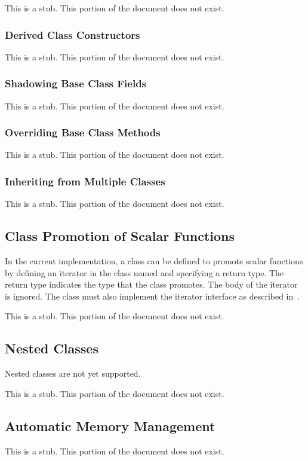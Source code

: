 This is a stub.  This portion of the document does not exist.

\subsubsection{Derived Class Constructors}
\label{Derived_Class_Constructors}

This is a stub.  This portion of the document does not exist.

\subsubsection{Shadowing Base Class Fields}
\label{Shadowing_Base_Class_Fields}

This is a stub.  This portion of the document does not exist.

\subsubsection{Overriding Base Class Methods}
\label{Overriding_Base_Class_Methods}

This is a stub.  This portion of the document does not exist.

\subsubsection{Inheriting from Multiple Classes}
\label{Inheriting_from_Multiple_Classes}

This is a stub.  This portion of the document does not exist.

\subsection{Class Promotion of Scalar Functions}
\label{Scalar Promotion}

\begin{implementation}
In the current implementation, a class can be defined to promote
scalar functions by defining an iterator in the class
named  and specifying a return type.  The return type
indicates the type that the class promotes.  The body of
the  iterator is ignored.  The class must also implement
the iterator interface as described in~.
\end{implementation}

This is a stub.  This portion of the document does not exist.

\subsection{Nested Classes}
\label{Nested_Classes}

\begin{implementation}
Nested classes are not yet supported.
\end{implementation}

This is a stub.  This portion of the document does not exist.

\subsection{Automatic Memory Management}
\label{Automatic_Memory_Management}

This is a stub.  This portion of the document does not exist.
